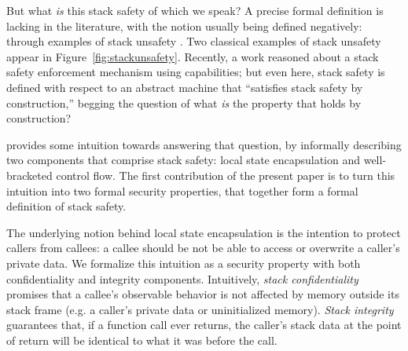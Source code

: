 \documentclass[acmsmall,review,anonymous]{acmart}\settopmatter{printfolios=true,printccs=false,printacmref=false}
\begin{document}
But what {\em is} this stack safety of which we speak? A precise formal
definition is lacking in the literature, with the notion usually being
defined negatively: through examples of stack unsafety
. Two classical
examples of stack unsafety appear in Figure~\ref{fig:stackunsafety}.
Recently, a  work reasoned
about a stack safety enforcement mechanism using capabilities;
but even here, stack safety is defined with respect to an abstract
machine that ``satisfies stack safety by construction,'' begging
the question of what {\em is} the property that holds by construction?

 provides some intuition towards answering that question,
by informally describing two components that comprise stack safety:
local state encapsulation and well-bracketed control flow. The first
contribution of the present paper is to
turn this intuition into two formal  security properties,
that together form a formal definition of stack safety.

The underlying notion behind local state encapsulation is the
intention to protect callers from callees: a callee should be not be
able to access or overwrite a caller's private data. We formalize this
intuition as a security property with both confidentiality and
integrity components.
%
Intuitively, {\em stack confidentiality} promises that a callee's
observable behavior is not affected by memory outside its stack frame
(e.g. a caller's private data or uninitialized memory).  {\em Stack
  integrity} guarantees that, if a function call ever returns, the caller's
stack data at the point of return will be identical to what it was before
the call.  
\end{document}
